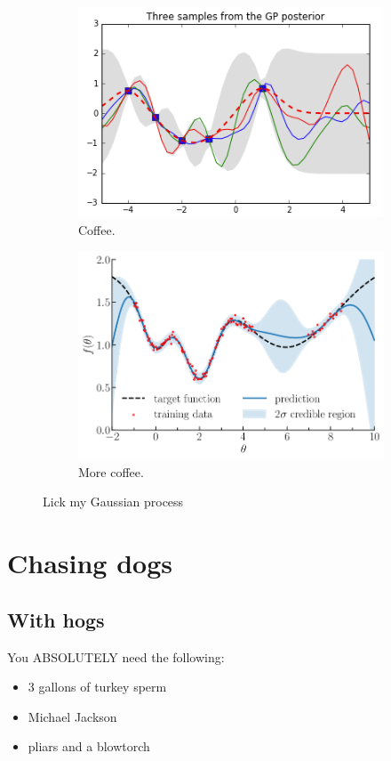 \documentclass[]{article}
\begin{document}
\begin{figure}[h!]
	\centering
	\begin{subfigure}[b]{0.4\linewidth}
		\includegraphics[width=\linewidth]{ims/pic1.png}
		\caption{Coffee.}
	\end{subfigure}
	\begin{subfigure}[b]{0.4\linewidth}
		\includegraphics[width=\linewidth]{ims/pic2.png}
		\caption{More coffee.}
	\end{subfigure}
	\caption{Lick my Gaussian process}
	\label{fig:coffee}
\end{figure}

\section{Chasing dogs}
\subsection{With hogs}
You ABSOLUTELY need the following:
\begin{itemize}
	\item 3 gallons of turkey sperm
	\item Michael Jackson
	\item pliars and a blowtorch
\end{itemize}
\end{document}

